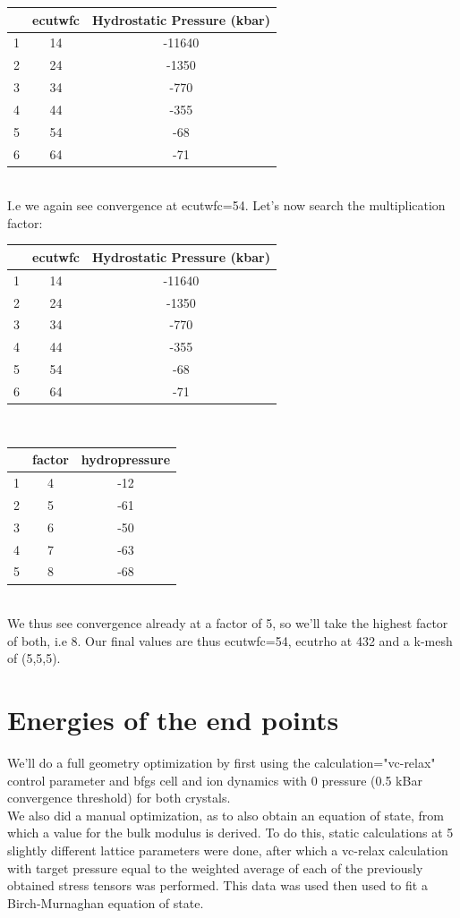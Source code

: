\documentclass[twoside,twocolumn,11pt]{article} %
\begin{document}
\begin{table}[ht]
\begin{tabular}{c|c|c}
	&ecutwfc&Hydrostatic Pressure (kbar)\\
	\hline
	1&14&-11640\\
	2&24&-1350\\
	3&34&-770\\
	4&44&-355\\
	5&54&-68\\
	6&64&-71\\
\end{tabular}
\end{table}\\
I.e we again see convergence at ecutwfc=54. Let's now search the multiplication factor:
\begin{table}[ht]
\begin{tabular}{c|c|c}
	&ecutwfc&Hydrostatic Pressure (kbar)\\
	\hline
	1&14&-11640\\
	2&24&-1350\\
	3&34&-770\\
	4&44&-355\\
	5&54&-68\\
	6&64&-71\\
\end{tabular}
\end{table}\\
\begin{table}[ht]
\begin{tabular}{c|c|c}
	&factor&hydropressure\\
	\hline
	1&4&-12\\
	2&5&-61\\
	3&6&-50\\
	4&7&-63\\
	5&8&-68\\
\end{tabular}
\end{table}\\
We thus see convergence already at a factor of 5, so we'll take the highest factor of both, i.e 8. Our final 
values are thus ecutwfc=54, ecutrho at 432 and a k-mesh of (5,5,5).
\section{Energies of the end points}
We'll do a full geometry optimization by first using the
calculation="vc-relax" control parameter and bfgs cell and ion
dynamics with 0 pressure (0.5 kBar convergence threshold) for
both crystals.\\
We also did a manual optimization, as to also obtain an equation of state, from which a value for the bulk modulus is derived. To do this, static calculations at 5 slightly different lattice parameters were done, after which a vc-relax calculation with target pressure equal to the weighted average of each of the previously obtained stress tensors was performed. This data was used then used to fit a Birch-Murnaghan equation of state.
\end{document}
